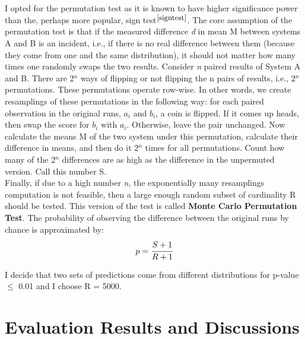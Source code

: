 I opted for the permutation test as it is known to have higher significance power than the, perhaps more popular, sign test$^{\small \cite{signtest}}$. The core assumption of the permutation test is that if the measured difference \textit{d} in mean M between systems A and B is an incident, i.e., if there is no real difference between them (because they come from one and the same distribution), it should not matter how many times one randomly swaps the two results. Consider \textit{n} paired results of System A and B. There are 2$^n$ ways of flipping or not flipping the n pairs of results, i.e., 2$^n$ permutations. These permutations operate row-wise. In other words, we create resamplings of these permutations in the following way: for each paired observation in the original runs, $a_i$ and $b_i$, a coin is flipped. If it comes up heads, then swap the score for $b_i$ with $a_i$. Otherwise, leave the pair unchanged. Now calculate the means M of the two system under this permutation, calculate their difference in means, and then do it 2$^n$ times for all permutations. Count how many of the 2$^n$ differences are as high as the difference in the unpermuted version. Call this number S. \\

Finally, if due to a high number \textit{n}, the exponentially many resamplings computation is not feasible, then a large enough random subset of cardinality R should be tested. This version of the test is called \textbf{Monte Carlo Permutation Test}. The probability of observing the difference between the original runs by chance is approximated by: \\

\begin{equation}
  p = \cfrac{S + 1}{R + 1}
\end{equation}

\smallskip

I decide that two sets of predictions come from different distributions for p-value $\leq$ 0.01 and I choose R = 5000.

\section{Evaluation Results and Discussions} \label{Evaluation Results}

